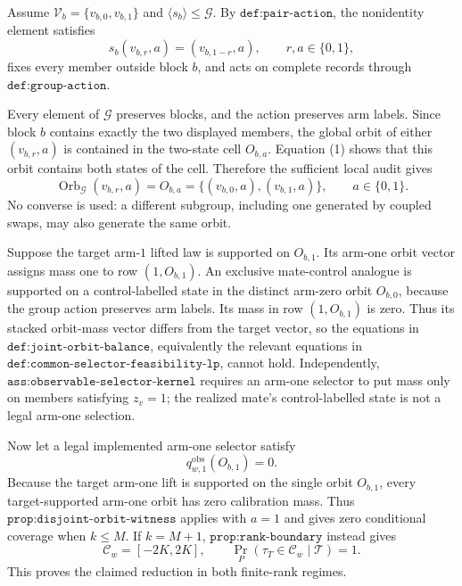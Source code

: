 Assume \(\mathcal V_b=\{v_{b,0},v_{b,1}\}\) and \(\langle s_b\rangle\le\mathcal G\). By \(\texttt{def:pair-action}\), the nonidentity element satisfies
\[
s_b(v_{b,r},a)=(v_{b,1-r},a),
\qquad r,a\in\{0,1\},
\tag{1}
\]
fixes every member outside block \(b\), and acts on complete records through \(\texttt{def:group-action}\).

Every element of \(\mathcal G\) preserves blocks, and the action preserves arm labels. Since block \(b\) contains exactly the two displayed members, the global orbit of either \((v_{b,r},a)\) is contained in the two-state cell \(O_{b,a}\). Equation (1) shows that this orbit contains both states of the cell. Therefore the sufficient local audit gives
\[
\operatorname{Orb}_{\mathcal G}(v_{b,r},a)
=
O_{b,a}
=
\{(v_{b,0},a),(v_{b,1},a)\},
\qquad a\in\{0,1\}.
\tag{2}
\]
No converse is used: a different subgroup, including one generated by coupled swaps, may also generate the same orbit.

Suppose the target arm-\(1\) lifted law is supported on \(O_{b,1}\). Its arm-one orbit vector assigns mass one to row \((1,O_{b,1})\). An exclusive mate-control analogue is supported on a control-labelled state in the distinct arm-zero orbit \(O_{b,0}\), because the group action preserves arm labels. Its mass in row \((1,O_{b,1})\) is zero. Thus its stacked orbit-mass vector differs from the target vector, so the equations in \(\texttt{def:joint-orbit-balance}\), equivalently the relevant equations in \(\texttt{def:common-selector-feasibility-lp}\), cannot hold. Independently, \(\texttt{ass:observable-selector-kernel}\) requires an arm-one selector to put mass only on members satisfying \(z_v=1\); the realized mate's control-labelled state is not a legal arm-one selection.

Now let a legal implemented arm-one selector satisfy
\[
q^{\mathrm{obs}}_{w,1}(O_{b,1})=0.
\tag{3}
\]
Because the target arm-one lift is supported on the single orbit \(O_{b,1}\), every target-supported arm-one orbit has zero calibration mass. Thus \(\texttt{prop:disjoint-orbit-witness}\) applies with \(a=1\) and gives zero conditional coverage when \(k\le M\). If \(k=M+1\), \(\texttt{prop:rank-boundary}\) instead gives
\[
\mathcal C_w=[-2K,2K],
\qquad
\Pr_P(\tau_T\in\mathcal C_w\mid\mathcal T)=1.
\]
This proves the claimed reduction in both finite-rank regimes.